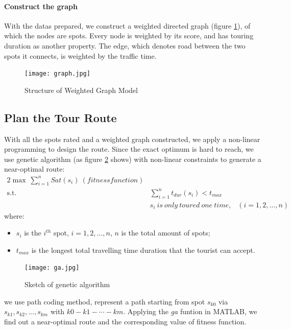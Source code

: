 \documentclass{mcmthesis}
\begin{document}
  \paragraph{Construct the graph} 

  With the datas prepared, we construct a weighted directed graph (figure \ref{fig:graph}), of which the nodes are spots. Every node is weighted by its score, and has touring duration as another property. The edge, which denotes road between the two spots it connects, is weighted by the traffic time.
  \begin{figure}[ht]
    \centering
    \texttt{[image: graph.jpg]}
    \caption{Structure of Weighted Graph Model}
    \label{fig:graph}
  \end{figure}

\subsection{Plan the Tour Route}
  With all the spots rated and a weighted graph constructed, we apply a non-linear programming to design the route. Since the exact optimum is hard to reach, we use genetic algorithm (as figure \ref{fig:ga} shows) with non-linear constraints to generate a near-optimal route:
  \begin{alignat}{2}   %
    \max~\sum_{i=1}^{n}Sat(s_{i})~(fitness function)\\
    \mbox{s.t.}\quad
    &\sum_{i=1}^{n}t_{dur}(s_{i}) < t_{max}\\
    &s_{i}~is~only~toured~one~time, & (i=1,2,\ldots,n)
  \end{alignat}
  where:
  \begin{itemize}
    \item $s_{i}$ is the $i^{th}$ spot, $i=1,2,\ldots,n$, $n$ is the total amount of spots;
    \item $t_{max}$ is the longest total travelling time duration that the tourist can accept.
  \end{itemize}
  \begin{figure}[ht]
    \centering
    \texttt{[image: ga.jpg]}
    \caption{Sketch of genetic algorithm}
    \label{fig:ga}
  \end{figure}
  we use path coding method, represent a path starting from spot $s_{k0}$ via $s_{k1}, s_{k2},\ldots,s_{km}$ with $k0-k1-\cdots-km$. Applying the \emph{ga} funtion in MATLAB, we find out a near-optimal route and the corresponding value of fitness function.
 
\end{document}
